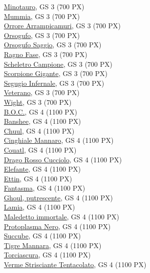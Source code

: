 \begin{multicols}{3}
{\hyperlink{Minotauro}{Minotauro}, GS 3 (700 PX)\\
\hyperlink{Mummia}{Mummia}, GS 3 (700 PX)\\
\hyperlink{Orrore Arrampicamuri}{Orrore Arrampicamuri}, GS 3 (700 PX)\\
\hyperlink{Orsogufo}{Orsogufo}, GS 3 (700 PX)\\
\hyperlink{Orsogufo Saggio}{Orsogufo Saggio}, GS 3 (700 PX)\\
\hyperlink{Ragno Fase}{Ragno Fase}, GS 3 (700 PX)\\
\hyperlink{Scheletro Campione}{Scheletro Campione}, GS 3 (700 PX)\\
\hyperlink{Scorpione Gigante}{Scorpione Gigante}, GS 3 (700 PX)\\
\hyperlink{Segugio Infernale}{Segugio Infernale}, GS 3 (700 PX)\\
\hyperlink{Veterano}{Veterano}, GS 3 (700 PX)\\
\hyperlink{Wight}{Wight}, GS 3 (700 PX)\\
\hyperlink{B.O.C.}{B.O.C.}, GS 4 (1100 PX)\\
\hyperlink{Banshee}{Banshee}, GS 4 (1100 PX)\\
\hyperlink{Chuul}{Chuul}, GS 4 (1100 PX)\\
\hyperlink{Cinghiale Mannaro}{Cinghiale Mannaro}, GS 4 (1100 PX)\\
\hyperlink{Couatl}{Couatl}, GS 4 (1100 PX)\\
\hyperlink{Drago Rosso Cucciolo}{Drago Rosso Cucciolo}, GS 4 (1100 PX)\\
\hyperlink{Elefante}{Elefante}, GS 4 (1100 PX)\\
\hyperlink{Ettin}{Ettin}, GS 4 (1100 PX)\\
\hyperlink{Fantasma}{Fantasma}, GS 4 (1100 PX)\\
\hyperlink{Ghoul, putrescente}{Ghoul, putrescente}, GS 4 (1100 PX)\\
\hyperlink{Lamia}{Lamia}, GS 4 (1100 PX)\\
\hyperlink{Maledetto immortale}{Maledetto immortale}, GS 4 (1100 PX)\\
\hyperlink{Protoplasma Nero}{Protoplasma Nero}, GS 4 (1100 PX)\\
\hyperlink{Succube}{Succube}, GS 4 (1100 PX)\\
\hyperlink{Tigre Mannara}{Tigre Mannara}, GS 4 (1100 PX)\\
\hyperlink{Torciascura}{Torciascura}, GS 4 (1100 PX)\\
\hyperlink{Verme Strisciante Tentacolato}{Verme Strisciante Tentacolato}, GS 4 (1100 PX)\\
}
\end{multicols}
